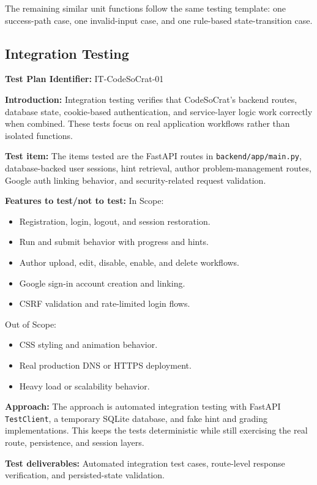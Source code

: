The remaining similar unit functions follow the same testing template: one success-path case, one invalid-input case, and one rule-based state-transition case.

\subsection{Integration Testing}
\textbf{Test Plan Identifier:}
IT-CodeSoCrat-01

\textbf{Introduction:}
Integration testing verifies that CodeSoCrat's backend routes, database state, cookie-based authentication, and service-layer logic work correctly when combined. These tests focus on real application workflows rather than isolated functions.

\textbf{Test item:}
The items tested are the FastAPI routes in \texttt{backend/app/main.py}, database-backed user sessions, hint retrieval, author problem-management routes, Google auth linking behavior, and security-related request validation.

\textbf{Features to test/not to test:}
In Scope:
\begin{itemize}
    \item Registration, login, logout, and session restoration.
    \item Run and submit behavior with progress and hints.
    \item Author upload, edit, disable, enable, and delete workflows.
    \item Google sign-in account creation and linking.
    \item CSRF validation and rate-limited login flows.
\end{itemize}

Out of Scope:
\begin{itemize}
    \item CSS styling and animation behavior.
    \item Real production DNS or HTTPS deployment.
    \item Heavy load or scalability behavior.
\end{itemize}

\textbf{Approach:}
The approach is automated integration testing with FastAPI \texttt{TestClient}, a temporary SQLite database, and fake hint and grading implementations. This keeps the tests deterministic while still exercising the real route, persistence, and session layers.

\textbf{Test deliverables:}
Automated integration test cases, route-level response verification, and persisted-state validation.

